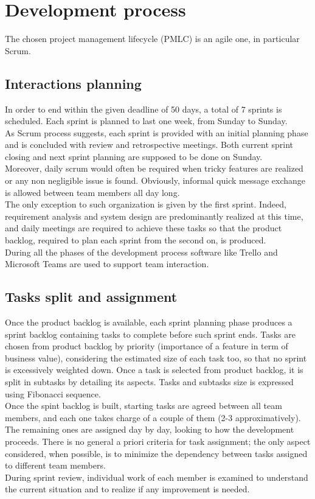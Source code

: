 \chapter{Development process}

The chosen project management lifecycle (PMLC) is an agile one, in particular Scrum. 
\section{Interactions planning}

In order to end within the given deadline of 50 days, a total of 7 sprints is scheduled. Each sprint is planned to last one week, from Sunday to Sunday.
\\
As Scrum process suggests, each sprint is provided with an initial planning phase and is concluded with review and retrospective meetings. Both current sprint closing and next sprint planning are supposed to be done on Sunday.
\\
Moreover, daily scrum would often be required when tricky features are realized or any non negligible issue is found. Obviously, informal quick message exchange is allowed between team members all day long.
\\
The only exception to such organization is given by the first sprint. Indeed, requirement analysis and system design are predominantly realized at this time, and daily meetings are required to achieve these tasks so that the product backlog, required to plan each sprint from the second on, is produced.
\\
During all the phases of the development process software like Trello and Microsoft Teams are used to support team interaction.


\section{Tasks split and assignment}

Once the product backlog is available, each sprint planning phase produces a sprint backlog containing tasks to complete before such sprint ends. Tasks are chosen from product backlog by priority (importance of a feature in term of business value), considering the estimated size of each task too, so that no sprint is excessively weighted down. Once a task is selected from product backlog, it is split in subtasks by detailing its aspects. Tasks and subtasks size is expressed using Fibonacci sequence. 
\\
Once the spint backlog is built, starting tasks are agreed between all team members, and each one takes charge of a couple of them (2-3 approximatively). The remaining ones are assigned day by day, looking to how the development proceeds. There is no general a priori criteria for task assignment; the only aspect considered, when possible, is to minimize the dependency between tasks assigned to different team members. 
\\
During sprint review, individual work of each member is examined to understand the current situation and to realize if any improvement is needed.

